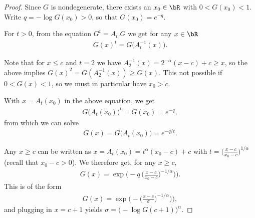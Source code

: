 \begin{proof}

  Since $G$ is nondegenerate, there exists an $x_0 \in \bR$
  with $0 < G(x_0) < 1$. Write $q = -\log G(x_0) > 0$,
  so that $G(x_0) = e^{-q}$.

  For $t > 0$, from the equation $G^{t} = A_t . G$
  we get for any $x \in \bR$
  \begin{align*}
  G(x)^t = G \big( A_t^{-1}(x) \big) . %
  \end{align*}

  Note that for $x \le c$ and $t = 2$ we have $A_2^{-1}(x) = 2^{-\alpha}(x-c) + c \ge x$,
  so the above implies $G(x)^2 = G(A_2^{-1}(x)) \ge G(x)$.
  This not possible if $0 < G(x) < 1$, so we must in particular have $x_0 > c$.

  With $x = A_t(x_0)$ in the above equation, %
  we get
  \begin{align*}
    G\big( A_t(x_0) \big)^{t} = G(x_0) = e^{- q},
  \end{align*}
  from which we can solve
  \begin{align*}
    G(x) = G\big( A_t(x_0) \big) = e^{-q/t} .
  \end{align*}

  Any $x \ge c$ can be written as $x = A_t(x_0) = t^{\alpha} (x_0-c) + c$
  with $t = \big( \frac{x - c}{x_0 - c} \big)^{1/\alpha}$
  (recall that $x_0 - c > 0$).
  We therefore get, for any $x \ge c$,
  \begin{align*}
    G(x) = \exp \Big( - q \, \big( \frac{x - c}{x_0 - c} \big)^{-1/\alpha} \big) \Big) .
  \end{align*}
  This is of the form
  \begin{align*}
    G(x) = \exp \Big( - \big( \frac{x - c}{\sigma} \big)^{-1/\alpha} \big) \Big) ,
  \end{align*}
  and plugging in $x = c + 1$ yields $\sigma = \big(- \log G(c+1)\big)^{\alpha}$.
\end{proof}


